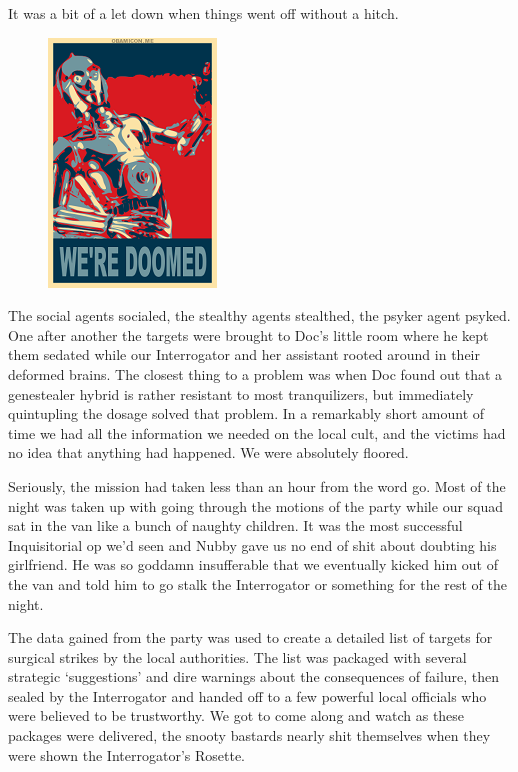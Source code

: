It was a bit of a let down when things went off without a hitch.

\begin{figure}
	\begin{center}
		\includegraphics[width=\figwidth]{pics/5/9.png}
	\end{center}
\end{figure}
The social agents socialed, the stealthy agents stealthed, the psyker agent psyked. 
One after another the targets were brought to Doc’s little room where he kept them sedated while  our Interrogator and her assistant rooted around in their deformed brains. 
The closest thing to a problem was when Doc found out that a genestealer hybrid is rather resistant to most tranquilizers, but immediately quintupling the dosage solved that problem. 
In a remarkably short amount of time we had all the information we needed on the local cult, and the victims had no idea that anything had happened. 
We were absolutely floored.

Seriously, the mission had taken less than an hour from the word go. 
Most of the night was taken up with going through the motions of the party while our squad sat in the van like a bunch of naughty children. 
It was the most successful Inquisitorial op we’d seen and Nubby gave us no end of shit about doubting his girlfriend. 
He was so goddamn insufferable that we eventually kicked him out of the van and told him to go stalk the Interrogator or something for the rest of the night.

The data gained from the party was used to create a detailed list of targets for surgical strikes by the local authorities. 
The list was packaged with several strategic ‘suggestions’ and dire warnings about the consequences of failure, then sealed by the Interrogator and handed off to a few powerful local officials who were believed to be trustworthy. 
We got to come along and watch as these packages were delivered, the snooty bastards nearly shit themselves when they were shown the Interrogator’s Rosette. 

